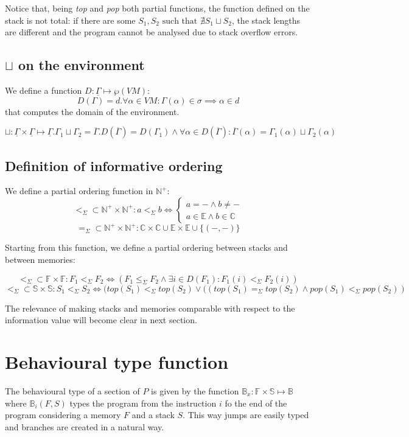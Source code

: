 \documentclass{amsart}
\newcommand{\N}{\mathbb{N}}
\newcommand{\E}{\mathbb{E}}
\newcommand{\C}{\mathbb{C}}
\newcommand{\bB}[1]{\mathbb{B}_{#1}}
\newcommand{\bF}{\mathbb{F}}
\newcommand{\bS}{\mathbb{S}}
\newcommand{\Int}{\N^+}
\newcommand{\Gset}{\underline{\Gamma}}
\newcommand{\eqs}{=_\Sigma}
\newcommand{\less}{<_\Sigma}
\newcommand{\leqs}{\leq_\Sigma}
\numberwithin{equation}{section}
\theoremstyle{plain} %
\theoremstyle{definition}
\theoremstyle{remark}
\begin{document}
Notice that, being \emph{top} and \emph{pop} both partial functions, the function defined on the stack is not total: if there are some $S_1, S_2 \text{ such that } \nexists S_1 \sqcup S_2$, the stack lengths are different and the program cannot be analysed due to stack overflow errors.

\subsection{$\sqcup$ on the environment}
We define a function $D: \Gset{} \mapsto \wp(VM)$:\\
\[D(\Gamma) = d.\forall \alpha \in VM: \Gamma(\alpha) \in \sigma \implies \alpha \in d\]
that computes the domain of the environment.

\[
\sqcup: \Gset{} \times \Gset{} \mapsto \Gset{}. \Gamma_1 \sqcup \Gamma_2 = \overline{\Gamma}. D(\overline{\Gamma}) = D(\Gamma_1) \wedge \forall \alpha \in D(\overline{\Gamma}): \overline{\Gamma}(\alpha) = \Gamma_1(\alpha) \sqcup \Gamma_2(\alpha)
\]

\subsection{Definition of informative ordering}

We define a partial ordering function in $\Int{}$:
\[\less{} \subset \Int{} \times \Int{}: a \less{} b \iff
\begin{cases}
a = - \wedge b \neq -\\
a \in \E{} \wedge b \in \C{}
\end{cases}\]
\[\eqs{} \subset \Int{} \times \Int{}: \C{} \times \C{} \cup \E{} \times \E{} \cup \{(-, -)\}\]

Starting from this function, we define a partial ordering between stacks and between memories:

\[\less{} \subset \bF{} \times \bF{}: F_1 \less F_2 \iff (F_1 \leqs F_2 \wedge \exists i \in D(F_1): F_1(i) \less F_2(i))\]
\[\less \subset \bS{} \times \bS{}: S_1 \less S_2 \iff (top(S_1) \less top(S_2) \vee ((top(S_1) \eqs top(S_2) \wedge pop(S_1) \less pop(S_2))\]

The relevance of making stacks and memories comparable with respect to the information value will become clear in next section.


\section{Behavioural type function}
The behavioural type of a section of $P$ is given by the function $\bB{x}:\bF{} \times \bS{} \mapsto \bB{}$ where $\bB{i}(F, S)$ types the program from the instruction $i$ fo the end of the program considering a memory $F$ and a stack $S$. This way jumps are easily typed and branches are created in a natural way.
\end{document}
